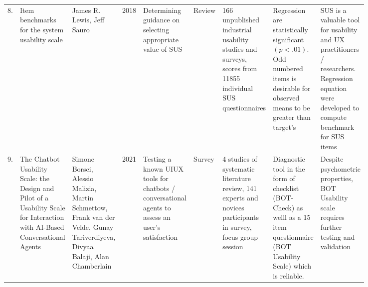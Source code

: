 \documentclass[
  11pt, %
]{assignment}
\begin{document}
\begin{landscape}
\begin{longtable}[l]{r | p{0.075\linewidth} p{0.08\linewidth} m{0.02\linewidth} p{0.15\linewidth} p{0.05\linewidth} p{0.17\linewidth} p{0.13\linewidth} p{0.17\linewidth}}
    8. & Item benchmarks for the system usability scale                                                                                                        & James R. Lewis, Jeff Sauro                                                                                                  & 2018 & Determining guidance on selecting appropriate value of SUS                                                               & Review             & 166 unpublished industrial usability studies and surveys, scores from 11855 individual SUS questionnaires                              & Regression are statistically significant \(( p < .01 )\). Odd numbered items is desirable for observed means to be greater than target's                                    & SUS is a valuable tool for usability and UX practitioners / researchers. Regression equation were developed to compute benchmark for SUS items                                                                                                                                                                                                               \\
    9. & The Chatbot Usability Scale: the Design and Pilot of a Usability Scale for Interaction with AI-Based Conversational Agents                            & Simone Borsci, Alessio Malizia, Martin Schmettow, Frank van der Velde, Gunay Tariverdiyeva, Divyaa Balaji, Alan Chamberlain & 2021 & Testing a known UIUX tools for chatbots / conversational agents to assess an user's satisfaction                         & Survey             & 4 studies of systematic literature review, 141 experts and novices participants in survey, focus group session                         & Diagnostic tool in the form of checklist (BOT-Check) as welll as a 15 item questionnaire (BOT Usability Scale) which is reliable.                                           & Despite psychometric properties, BOT Usability scale requires further testing and validation                                                                                                                                                                                                                                                                 \\
    \bottomrule
  \end{longtable}
\end{landscape}
\end{document}

